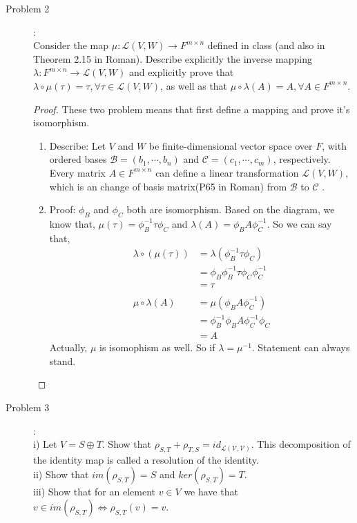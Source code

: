 \documentclass[a4paper]{article}
\begin{document}
\begin{description}
\item[Problem 2]:\\
Consider the map $\mu : \mathcal{L}(V, W)\rightarrow
F^{m\times n}$ defined in class (and also in Theorem 2.15
in Roman). Describe explicitly the inverse mapping $\lambda :
F^{m\times n}\rightarrow \mathcal{L}(V, W)$ and explicitly
prove that $\lambda\circ\mu(\tau) = \tau,
 \forall\tau\in\mathcal{L}(V, W)$, as well as that
 $\mu\circ\lambda(A) = A, \forall A\in F^{m\times n}$.

\begin{proof}These two problem means that first define a mapping and prove it's isomorphism.
  \begin{enumerate}
    \item{Describe: Let $V$ and $W$ be finite-dimensional vector space over $F$, with ordered bases $\mathcal{B}=(b_{1},\cdots,b_{n})$ and $\mathcal{C}=(c_{1},\cdots,c_{m})$, respectively. Every matrix $A \in F^{m\times n}$ can define a linear transformation $\mathcal{L}(V,W)$, which is an change of basis matrix(P65 in Roman) from $\mathcal{B}$ to $\mathcal{C}$ .}
    \item{Proof: $\phi_{B}$ and $\phi_{C}$ both are isomorphism.
      Based on the diagram, we know that, $\mu(\tau)=\phi_{B}^{-1}\tau\phi_{C}$ and $\lambda(A)=\phi_{B}A\phi_{C}^{-1}$.
      So we can say that,
      \begin{align*}
        \lambda\circ(\mu(\tau))&=\lambda(\phi_{B}^{-1}\tau\phi_{C})\\
        &=\phi_{B}\phi_{B}^{-1}\tau\phi_{C}\phi_{C}^{-1}\\
        &=\tau\\
        \\
        \mu\circ\lambda(A)&=\mu(\phi_{B}A\phi_{C}^{-1})\\
        &=\phi_{B}^{-1}\phi_{B}A\phi_{C}^{-1}\phi_{C}\\
        &=A
      \end{align*}
      Actually, $\mu$ is isomophism as well. So if $\lambda=\mu^{-1}$. Statement can always stand.
    }
  \end{enumerate}
\end{proof}

\item[Problem 3]:\\
i) Let $V = S\oplus T$. Show that $\rho_{S,T} +
\rho_{T,S} = id_\mathcal{L(V, V)}$. This decomposition
of the identity map is called a resolution of the identity.\\
ii) Show that $im(\rho_{S,T}) = S$ and $ker(\rho_{S,T})
= T$.\\
iii) Show that for an element $v\in V$ we have that $v\in
im(\rho_{S,T})\Leftrightarrow\rho_{S,T}(v) = v$.



\end{description}
\end{document}
